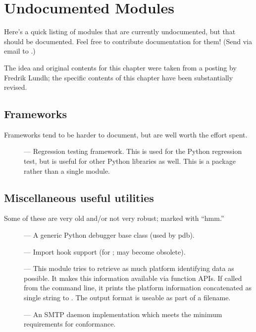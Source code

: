 \chapter{Undocumented Modules \label{undoc}}

Here's a quick listing of modules that are currently undocumented, but
that should be documented.  Feel free to contribute documentation for
them!  (Send via email to .)

The idea and original contents for this chapter were taken
from a posting by Fredrik Lundh; the specific contents of this chapter
have been substantially revised.


\section{Frameworks}

Frameworks tend to be harder to document, but are well worth the
effort spent.

\begin{description}
\item[]
--- Regression testing framework.  This is used for the Python
regression test, but is useful for other Python libraries as well.
This is a package rather than a single module.
\end{description}


\section{Miscellaneous useful utilities}

Some of these are very old and/or not very robust; marked with ``hmm.''

\begin{description}
\item[]
--- A generic Python debugger base class (used by pdb).

\item[]
--- Import hook support (for ; may become obsolete).

\item[]
--- This module tries to retrieve as much platform identifying data as
possible.  It makes this information available via function APIs.
If called from the command line, it prints the platform information
concatenated as single string to .  The output format
is useable as part of a filename.

\item[]
--- An SMTP daemon implementation which meets the minimum requirements
for  conformance.
\end{description}


